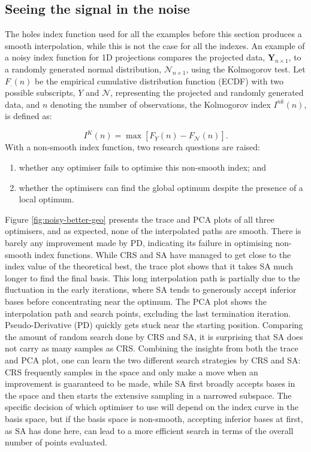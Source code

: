 \hypertarget{seeing-the-signal-in-the-noise}{%
\subsection{Seeing the signal in the
noise}\label{seeing-the-signal-in-the-noise}}

The holes index function used for all the examples before this section
produces a smooth interpolation, while this is not the case for all the
indexes. An example of a noisy index function for 1D projections
compares the projected data, \(\mathbf{Y}_{n \times 1}\), to a randomly
generated normal distribution, \(\mathcal{N}_{n \times 1}\), using the
Kolmogorov test. Let \(F_{.}(n)\) be the empirical cumulative
distribution function (ECDF) with two possible subscripts, \(Y\) and
\(\mathcal{N}\), representing the projected and randomly generated data,
and \(n\) denoting the number of observations, the Kolmogorov index
\(I^{nk}(n)\), is defined as:

\[I^{K}(n) = \max \left[F_{Y}(n) - F_{\mathcal{N}}(n)\right].\] With a
non-smooth index function, two research questions are raised:

\begin{enumerate}
\def\labelenumi{\arabic{enumi})}
\tightlist
\item
  whether any optimiser fails to optimise this non-smooth index; and
\item
  whether the optimisers can find the global optimum despite the
  presence of a local optimum.
\end{enumerate}

Figure \ref{fig:noisy-better-geo} presents the trace and PCA plots of
all three optimisers, and as expected, none of the interpolated paths
are smooth. There is barely any improvement made by PD, indicating its
failure in optimising non-smooth index functions. While CRS and SA have
managed to get close to the index value of the theoretical best, the
trace plot shows that it takes SA much longer to find the final basis.
This long interpolation path is partially due to the fluctuation in the
early iterations, where SA tends to generously accept inferior bases
before concentrating near the optimum. The PCA plot shows the
interpolation path and search points, excluding the last termination
iteration. Pseudo-Derivative (PD) quickly gets stuck near the starting
position. Comparing the amount of random search done by CRS and SA, it
is surprising that SA does not carry as many samples as CRS. Combining
the insights from both the trace and PCA plot, one can learn the two
different search strategies by CRS and SA: CRS frequently samples in the
space and only make a move when an improvement is guaranteed to be made,
while SA first broadly accepts bases in the space and then starts the
extensive sampling in a narrowed subspace. The specific decision of
which optimiser to use will depend on the index curve in the basis
space, but if the basis space is non-smooth, accepting inferior bases at
first, as SA has done here, can lead to a more efficient search in terms
of the overall number of points evaluated.

